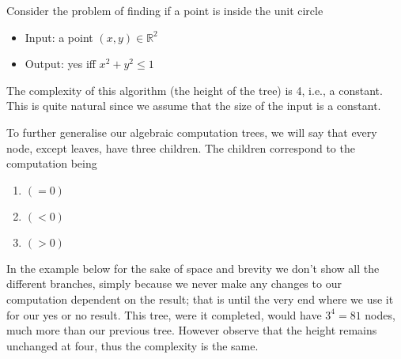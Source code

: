 \documentclass{article}
\theoremstyle{definition}
\begin{document}
Consider the problem of finding if a point is inside the unit circle
\begin{itemize}
    \item Input: a point $(x,y) \in \mathbb{R}^2$
    \item Output: yes iff $x^2 + y^2 \leq 1$
\end{itemize}
The complexity of this algorithm (the height of the tree) is 4, i.e., a constant.
This is quite natural since we assume that the size of the input is a constant.
\begin{center}
\end{center}

To further generalise our algebraic computation trees,
we will say that every node, except leaves, have three children.
The children correspond to the computation being
\begin{enumerate}
    \item $(= 0)$
    \item $(< 0)$
    \item $(> 0)$
\end{enumerate}
In the example below for the sake of space and brevity we don't show all the different branches,
simply because we never make any changes to our computation dependent on the result;
that is until the very end where we use it for our yes or no result.
This tree, were it completed, would have $3^4 = 81$ nodes,
much more than our previous tree.
However observe that the height remains unchanged at four,
thus the complexity is the same.
\end{document}
